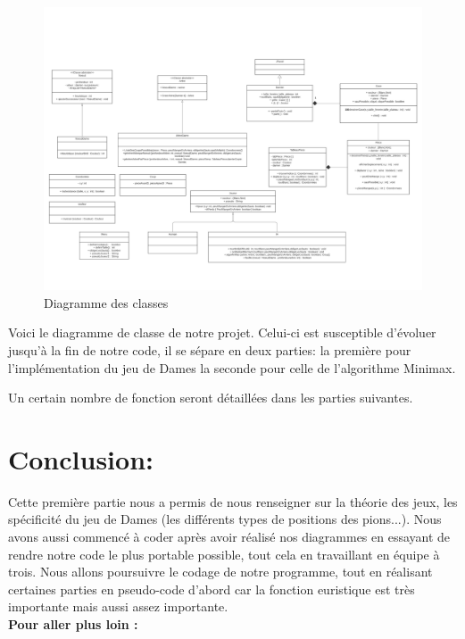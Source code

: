 \documentclass[12,french]{report}
\begin{document}
\begin{figure}[H]
	\center
	\includegraphics[width=1\textwidth]{./Images/Diagramme_classe}
	\caption{Diagramme des classes}
\end{figure}\vspace{0.2cm}



Voici le diagramme de classe de notre projet. Celui-ci est susceptible
d'évoluer jusqu'à la fin de notre code, il se sépare en deux parties:
la première pour l'implémentation du jeu de Dames la seconde pour
celle de l'algorithme Minimax.

Un certain nombre de fonction seront détaillées dans les parties suivantes.

\chapter*{Conclusion:}

Cette première partie nous a permis de nous renseigner sur la théorie
des jeux, les spécificité du jeu de Dames (les différents types de
positions des pions...). Nous avons aussi commencé à coder après avoir
réalisé nos diagrammes en essayant de rendre notre code le plus portable
possible, tout cela en travaillant en équipe à trois. Nous allons
poursuivre le codage de notre programme, tout en réalisant certaines
parties en pseudo-code d'abord car la fonction euristique est très
importante mais aussi assez importante.\\

\textbf{Pour aller plus loin :} \\
\end{document}
